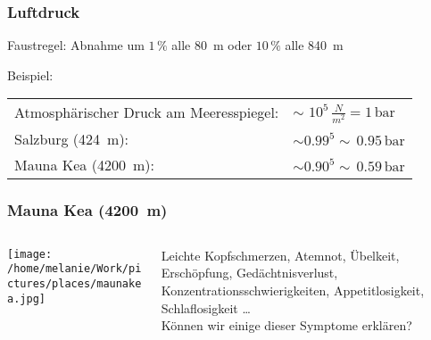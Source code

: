\documentclass{beamer}
\begin{document}
\begin{frame}
\frametitle{Luftdruck}

Faustregel: Abnahme um \(1\,\%\) alle \SI{80}{\meter} oder \(10\,\%\) alle \SI{840}{\meter} \\[0.5 cm]

\pause


Beispiel: 


\begin{tabular}{ll}
Atmosphärischer Druck am Meeresspiegel: & \(\sim\) \(10^5\,\frac{N}{m^2} = 1\,\text{bar}\) \\[0.2 cm]
Salzburg (\SI{424}{\meter}):            & \(\sim 0.99^5 \sim \, 0.95\, \text{bar}\) \\[0.2 cm]
Mauna Kea (\SI{4200}{\meter}):         & \(\sim 0.90^5 \sim \, 0.59\, \text{bar}\) \\[0.2 cm]
\end{tabular}


\end{frame}


\begin{frame}
\frametitle{Mauna Kea (\SI{4200}{\meter})}

\begin{columns}[c]

\begin{column}{5cm}

\begin{center}

\texttt{[image: /home/melanie/Work/pictures/places/maunakea.jpg]}

\end{center}

\end{column}

\begin{column}{5cm}

Leichte Kopfschmerzen, Atemnot, Übelkeit, Erschöpfung, Gedächtnisverlust, Konzentrationsschwierigkeiten, Appetitlosigkeit, Schlaflosigkeit \dots $\,$\\[0.5 cm]

Können wir einige dieser Symptome erklären?

\end{column}

\end{columns}

\end{frame}
\end{document}
